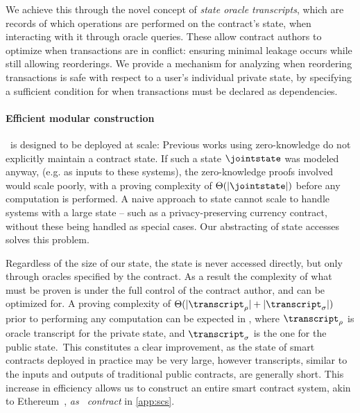 We achieve this through the novel concept of \emph{state oracle transcripts},
which are records of which operations are performed on the contract's
state, when interacting with it through oracle queries.
These allow contract authors to optimize when transactions are in conflict:
ensuring minimal leakage occurs while still allowing reorderings.
We provide a mechanism for analyzing when reordering transactions is safe with
respect to a user's individual private state, by specifying a sufficient condition for
when transactions must be declared as dependencies.

\paragraph{Efficient modular construction}

\kachina\ is designed to be deployed at scale: Previous works using
zero-knowledge do not explicitly maintain a contract state. If such a state
$\jointstate$ was modeled anyway, (e.g. as inputs to these systems), the
zero-knowledge proofs involved would scale poorly, with a proving complexity of
$\Theta(|\jointstate|)$ before any computation is performed. A
naive approach to state cannot scale to handle systems with a large state --
such as a privacy-preserving currency contract, without these being handled as
special cases. Our abstracting of state accesses solves this problem.

Regardless of the size of our state, the state
is never accessed directly, but only through oracles specified by the contract.
As a result the complexity of what must be proven is under the full control of the contract
author, and can be optimized for.
A proving complexity
of $\Theta(|\transcript_\rho| + |\transcript_\sigma|)$ prior to performing any computation can be expected
in \kachina, where $\transcript_\rho$ is oracle transcript for the private
state, and $\transcript_\sigma$ is the one for the public state.\ 
This constitutes a clear improvement, as the state of smart contracts deployed in
practice may be very large, however transcripts, similar to the
inputs and outputs of traditional public contracts, are generally
short.  This increase in efficiency allows us to construct an entire smart
contract system, akin to Ethereum~\cite{ethereum}, \emph{as \ankachina\
contract} in \iffull\autoref{app:scs}\else\cite[Appendix~J]{fullversion}\fi.


